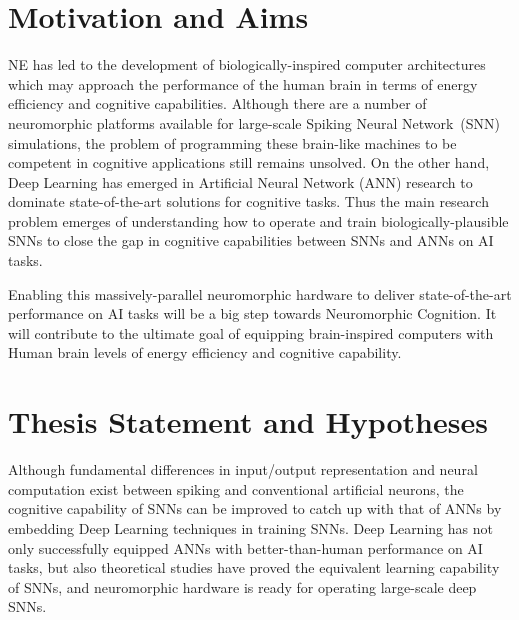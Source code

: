 \section{Motivation and Aims}
\label{sec:state_problem}
NE has led to the development of biologically-inspired computer architectures which may approach the performance of the human brain in terms of energy efficiency and cognitive capabilities.
Although there are a number of neuromorphic platforms available for large-scale Spiking Neural Network~(SNN) simulations, the problem of programming these brain-like machines to be competent in cognitive applications still remains unsolved.
On the other hand, Deep Learning has emerged in Artificial Neural Network (ANN) research to dominate state-of-the-art solutions for cognitive tasks.
Thus the main research problem emerges of understanding how to operate and train biologically-plausible SNNs to close the gap in cognitive capabilities between SNNs and ANNs on AI tasks.


Enabling this massively-parallel neuromorphic hardware to deliver state-of-the-art performance on AI tasks will be a big step towards Neuromorphic Cognition.
It will contribute to the ultimate goal of equipping brain-inspired computers with Human brain levels of energy efficiency and cognitive capability. 


\section{Thesis Statement and Hypotheses}
\label{sec:aim}
Although fundamental differences in input/output representation and neural computation exist between spiking and conventional artificial neurons, the cognitive capability of SNNs can be improved to catch up with that of ANNs by embedding Deep Learning techniques in training SNNs.
Deep Learning has not only successfully equipped ANNs with better-than-human performance on AI tasks, but also theoretical studies have proved the equivalent learning capability of SNNs, and neuromorphic hardware is ready for operating large-scale deep SNNs.

